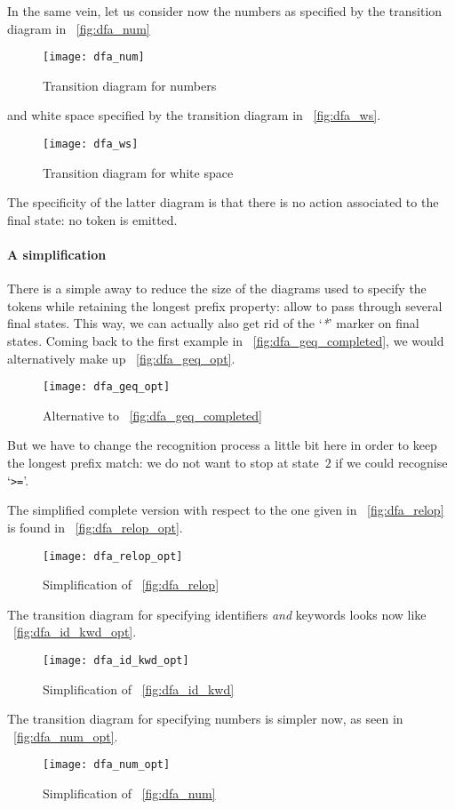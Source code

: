 \documentclass[12pt,a4paper]{article}
\begin{document}
In the same vein, let us consider now the numbers as specified by the
transition diagram in \fig~\vref{fig:dfa_num}
\begin{figure}
\centering
\texttt{[image: dfa\_num]}
\caption{Transition diagram for numbers\label{fig:dfa_num}}
\end{figure}
and white space specified by the transition diagram in
\fig~\vref{fig:dfa_ws}.
\begin{figure}
\centering
\texttt{[image: dfa\_ws]}
\caption{Transition diagram for white space\label{fig:dfa_ws}}
\end{figure}
The specificity of the latter diagram is that there is no action
associated to the final state: no token is emitted.

\paragraph{A simplification}

There is a simple away to reduce the size of the diagrams used to
specify the tokens while retaining the longest prefix property: allow
to pass through several final states. This way, we can actually also
get rid of the `\emph{\textsc{*}}' marker on final states. Coming back
to the first example in \fig~\vref{fig:dfa_geq_completed}, we would
alternatively make up \fig~\vref{fig:dfa_geq_opt}.
\begin{figure}
\centering
\texttt{[image: dfa\_geq\_opt]}
\caption{Alternative to \fig~\vref{fig:dfa_geq_completed}
\label{fig:dfa_geq_opt}}
\end{figure}
But we have to change the recognition process a little bit here in
order to keep the longest prefix match: we do not want to stop at
state~\(2\) if we could recognise `\texttt{>=}'.

The simplified complete version with respect to the one given in
\fig~\vref{fig:dfa_relop} is found in \fig~\vref{fig:dfa_relop_opt}.
\begin{figure}
\centering
\texttt{[image: dfa\_relop\_opt]}
\caption{Simplification of \fig~\vref{fig:dfa_relop}
\label{fig:dfa_relop_opt}}
\end{figure}
The transition diagram for specifying identifiers \emph{and} keywords
looks now like \fig~\vref{fig:dfa_id_kwd_opt}.
\begin{figure}
\centering
\texttt{[image: dfa\_id\_kwd\_opt]}
\caption{Simplification of \fig~\vref{fig:dfa_id_kwd}
\label{fig:dfa_id_kwd_opt}}
\end{figure}
The transition diagram for specifying numbers is simpler now, as seen
in \fig~\vref{fig:dfa_num_opt}.
\begin{figure}
\centering
\texttt{[image: dfa\_num\_opt]}
\caption{Simplification of \fig~\vref{fig:dfa_num}
\label{fig:dfa_num_opt}}
\end{figure}
\end{document}
